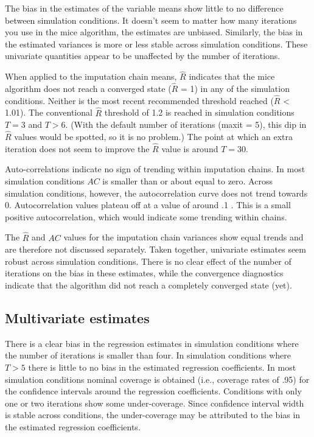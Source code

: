 \documentclass[Royal,times,sageh]{sagej}
\begin{document}
The bias in the estimates of the variable means show little to no
difference between simulation conditions. It doesn't seem to matter how
many iterations you use in the mice algorithm, the estimates are
unbiased. Similarly, the bias in the estimated variances is more or less
stable across simulation conditions. These univariate quantities appear
to be unaffected by the number of iterations.

When applied to the imputation chain means, \(\widehat{R}\) indicates
that the mice algorithm does not reach a converged state
(\(\widehat{R}\) = 1) in any of the simulation conditions. Neither is
the most recent recommended threshold reached (\(\widehat{R}\)
\textless{} 1.01). The conventional \(\widehat{R}\) threshold of 1.2 is
reached in simulation conditions \(T = 3\) and \(T > 6\). (With the
default number of iterations (maxit = 5), this dip in \(\widehat{R}\)
values would be spotted, so it is no problem.) The point at which an
extra iteration does not seem to improve the \(\widehat{R}\) value is
around \(T=30\).

Auto-correlations indicate no sign of trending within imputation chains.
In most simulation conditions \(AC\) is smaller than or about equal to
zero. Across simulation conditions, however, the autocorrelation curve
does not trend towards 0. Autocorrelation values plateau off at a value
of around .1 . This is a small positive autocorrelation, which would
indicate some trending within chains.

The \(\widehat{R}\) and \(AC\) values for the imputation chain variances
show equal trends and are therefore not discussed separately. Taken
together, univariate estimates seem robust across simulation conditions.
There is no clear effect of the number of iterations on the bias in
these estimates, while the convergence diagnostics indicate that the
algorithm did not reach a completely converged state (yet).

\hypertarget{multivariate-estimates}{%
\subsection{Multivariate estimates}\label{multivariate-estimates}}

There is a clear bias in the regression estimates in simulation
conditions where the number of iterations is smaller than four. In
simulation conditions where \(T > 5\) there is little to no bias in the
estimated regression coefficients. In most simulation conditions nominal
coverage is obtained (i.e., coverage rates of .95) for the confidence
intervals around the regression coefficients. Conditions with only one
or two iterations show some under-coverage. Since confidence interval
width is stable across conditions, the under-coverage may be attributed
to the bias in the estimated regression coefficients.
\end{document}
